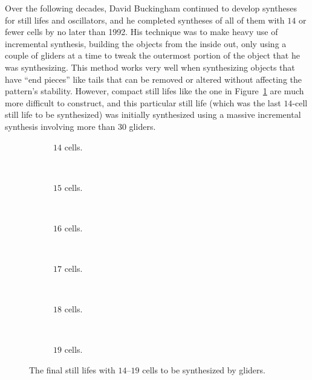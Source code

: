 Over the following decades, David Buckingham continued to develop syntheses for still lifes and oscillators, and he completed syntheses of all of them with $14$ or fewer cells by no later than 1992. His technique was to make heavy use of incremental synthesis, building the objects from the inside out, only using a couple of gliders at a time to tweak the outermost portion of the object that he was synthesizing. This method works very well when synthesizing objects that have ``end pieces'' like tails that can be removed or altered without affecting the pattern's stability. However, compact still lifes like the one in Figure~\ref{fig:14_cell_synth} are much more difficult to construct, and this particular still life (which was the last $14$-cell still life to be synthesized) was initially synthesized using a massive incremental synthesis involving more than $30$ gliders.

\begin{figure}[!htb]
	\centering
	\begin{subfigure}{.135\textwidth}
		\centering{}
		\caption{$14$ cells.}\label{fig:14_cell_synth}
	\end{subfigure} \ \ \ \ %
	\begin{subfigure}{.135\textwidth}
		\centering{}
		\caption{$15$ cells.}\label{fig:15_cell_synth}
	\end{subfigure} \ \ \ \ %
	\begin{subfigure}{.13\textwidth}
		\centering{}
		\caption{$16$ cells.}\label{fig:16_cell_synth}
	\end{subfigure} \ \ \ \ %
	\begin{subfigure}{.14\textwidth}
		\centering{}
		\caption{$17$ cells.}\label{fig:17_cell_synth}
	\end{subfigure} \ \ \ \ %
	\begin{subfigure}{.14\textwidth}
		\centering{}
		\caption{$18$ cells.}\label{fig:18_cell_synth}
	\end{subfigure} \ \ \ \ %
	\begin{subfigure}{.145\textwidth}
		\centering{}
		\caption{$19$ cells.}\label{fig:19_cell_synth}
	\end{subfigure}
	\caption{The final still lifes with $14$--$19$ cells to be synthesized by gliders.}\label{fig:hard_to_synth_sls}
\end{figure}

